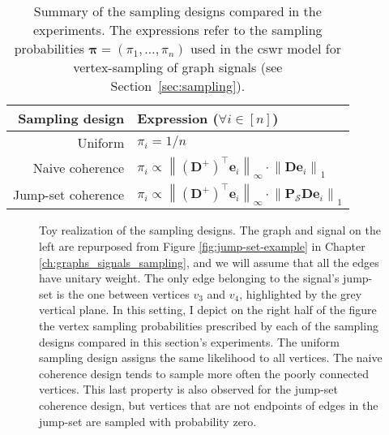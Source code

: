 \begin{table}[H]
    \centering
    \begin{tabularx}{0.6\textwidth}{rl}
        \hline
        Sampling design & Expression ($\forall i \in [n]$) \\
        \hline
        Uniform & $\pi_i = 1/n$ \\
        Naive coherence & $\pi_i \propto \left \| (\mathbf{D}^{+})^\top \mathbf{e}_i \right \|_{\infty} \cdot \left \| \mathbf{D} \mathbf{e}_i \right \|_1$ \\
        Jump-set coherence & $\pi_i \propto \left \| (\mathbf{D}^{+})^\top \mathbf{e}_i \right \|_{\infty} \cdot \left \| \mathbf{P}_\mathcal{S} \mathbf{D} \mathbf{e}_i \right \|_1$ \\
        \hline
    \end{tabularx}
    \caption[Summary of the three sampling designs compared in the experiments]{Summary of the sampling designs compared in the experiments. The expressions refer to the sampling probabilities $\bm{\pi} = (\pi_1, \dots, \pi_n)$ used in the \acrshort{cswr} model for vertex-sampling of graph signals (see Section~\ref{sec:sampling}).}
    \label{tab:summary_sampling_designs}
\end{table}

\begin{figure}[H]
    \centering
    
    \caption[Toy realization of the sampling designs]{Toy realization of the sampling designs. The graph and signal on the left are repurposed from Figure \ref{fig:jump-set-example} in Chapter \ref{ch:graphs_signals_sampling}, and we will assume that all the edges have unitary weight. The only edge belonging to the signal's jump-set is the one between vertices $v_3$ and $v_4$, highlighted by the grey vertical plane. In this setting, I depict on the right half of the figure the vertex sampling probabilities prescribed by each of the sampling designs compared in this section's experiments. The uniform sampling design assigns the same likelihood to all vertices. The naive coherence design tends to sample more often the poorly connected vertices. This last property is also observed for the jump-set coherence design, but vertices that are not endpoints of edges in the jump-set are sampled with probability zero.}
    \label{fig:sampling-design-examples}
\end{figure}

